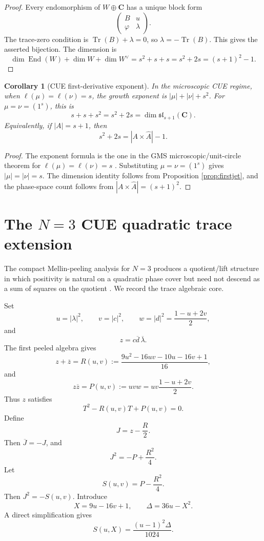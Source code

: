 \documentclass[11pt]{article}
\newcommand{\C}{\mathbf C}
\newcommand{\Tr}{\operatorname{Tr}}
\newcommand{\End}{\operatorname{End}}
\theoremstyle{plain}
\newtheorem{corollary}[theorem]{Corollary}
\theoremstyle{definition}
\numberwithin{equation}{section}
\begin{document}
\begin{proof}
Every endomorphism of \(W\oplus\C\) has a unique block form
\[
 \begin{pmatrix}B&u\\ \varphi&\lambda\end{pmatrix}.
\]
The trace-zero condition is \(\Tr(B)+\lambda=0\), so \(\lambda=-\Tr(B)\).  This gives the asserted bijection.  The dimension is
\[
 \dim\End(W)+\dim W+
 \dim W^\vee=s^2+s+s=s^2+2s=(s+1)^2-1.
\]
\end{proof}

\begin{corollary}[CUE first-derivative exponent]
In the microscopic CUE regime, when \(\ell(\mu)=\ell(\nu)=s\), the growth exponent is \(|\mu|+|\nu|+s^2\).  For \(\mu=\nu=(1^s)\), this is
\[
 s+s+s^2=s^2+2s=\dim\mathfrak{sl}_{s+1}(\C).
\]
Equivalently, if \(|A|=s+1\), then
\[
 s^2+2s=|A\times\widehat A|-1.
\]
\end{corollary}

\begin{proof}
The exponent formula is the one in the GMS microscopic/unit-circle theorem for \(\ell(\mu)=\ell(\nu)=s\) \cite{GMS}.  Substituting \(\mu=\nu=(1^s)\) gives \(|\mu|=|\nu|=s\).  The dimension identity follows from Proposition \ref{prop:firstjet}, and the phase-space count follows from \(|A\times\widehat A|=(s+1)^2\).
\end{proof}

\section{The \(N=3\) CUE quadratic trace extension}\label{sec:n3trace}

The compact Mellin-peeling analysis for \(N=3\) produces a quotient/lift structure in which positivity is natural on a quadratic phase cover but need not descend as a sum of squares on the quotient \cite{CUEPeeling}.  We record the trace algebraic core.

Set
\[
 u=|\lambda|^2,
 \qquad
 v=|c|^2,
 \qquad
 w=|d|^2=\frac{1-u+2v}{2},
\]
and
\[
 z=c\overline d\,\overline\lambda.
\]
The first peeled algebra gives
\[
 z+\overline z=R(u,v):=\frac{9u^2-16uv-10u-16v+1}{16},
\]
and
\[
 z\overline z=P(u,v):=uvw=uv\frac{1-u+2v}{2}.
\]
Thus \(z\) satisfies
\[
 T^2-R(u,v)T+P(u,v)=0.
\]
Define
\[
 J=z-\frac R2.
\]
Then \(\overline J=-J\), and
\[
 J^2=-P+\frac{R^2}{4}.
\]
Let
\[
 S(u,v)=P-\frac{R^2}{4}.
\]
Then \(J^2=-S(u,v)\).  Introduce
\[
 X=9u-16v+1,
 \qquad
 \Delta=36u-X^2.
\]
A direct simplification gives
\[
 S(u,X)=\frac{(u-1)^2\Delta}{1024}.
\]
\end{document}
